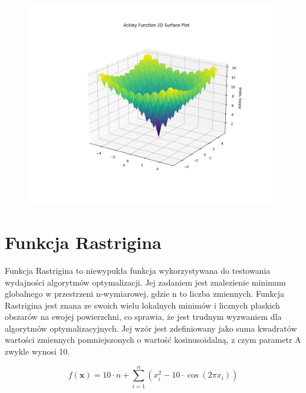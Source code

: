 \documentclass{article}
\begin{document}
\begin{figure}[H]
    \centering
    \includegraphics[width=1\textwidth]{img/AckleyFunction.png}
    \label{fig:ackley}
\end{figure}

\newpage

\section{Funkcja Rastrigina}
\hspace{0.5cm}Funkcja Rastrigina to niewypukła funkcja wykorzystywana do testowania wydajności algorytmów optymalizacji. Jej zadaniem jest znalezienie minimum globalnego w przestrzeni n-wymiarowej, gdzie n to liczba zmiennych. Funkcja Rastrigina jest znana ze swoich wielu lokalnych minimów i licznych płaskich obszarów na swojej powierzchni, co sprawia, że jest trudnym wyzwaniem dla algorytmów optymalizacyjnych. Jej wzór jest zdefiniowany jako suma kwadratów wartości zmiennych pomniejszonych o wartość kosinusoidalną, z czym parametr A zwykle wynosi 10.

\[ f(\mathbf{x}) = 10 \cdot n + \sum_{i=1}^{n} \left( x_i^2 - 10 \cdot \cos(2\pi x_i) \right) \]
\end{document}
